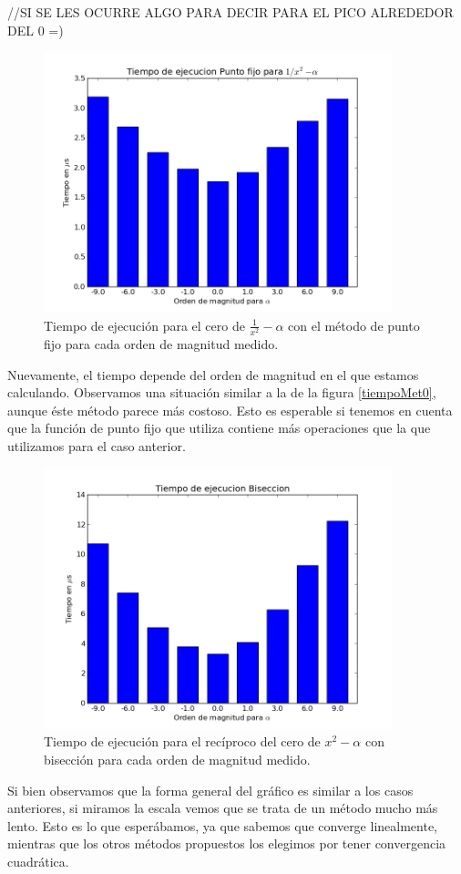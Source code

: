 //SI SE LES OCURRE ALGO PARA DECIR PARA EL PICO ALREDEDOR DEL 0 =)

\begin{figure}[H]
  \centering
    \includegraphics[width=0.9\textwidth]{../data/Tiempo metodo 2.png}
    \caption{Tiempo de ejecución para el cero de $\frac{1}{x^2} - \alpha$ con el método de punto fijo para cada orden de magnitud medido.}
    \label{tiempoMet2}
\end{figure}

Nuevamente, el tiempo depende del orden de magnitud en el que estamos calculando. Observamos una situación similar a la de la figura \ref{tiempoMet0}, aunque éste método parece más costoso. Esto es esperable si tenemos en cuenta que la función de punto fijo que utiliza contiene más operaciones que la que utilizamos para  el caso anterior.

\begin{figure}[H]
  \centering
    \includegraphics[width=0.9\textwidth]{../data/Tiempo metodo 3.png}
    \caption{Tiempo de ejecución para el recíproco del cero de ${x^2} - \alpha$ con bisección para cada orden de magnitud medido.}
    \label{tiempoMet3}
\end{figure}

Si bien observamos que la forma general del gráfico es similar a los casos anteriores, si miramos la escala vemos que se trata de un método mucho más lento. Esto es lo que esperábamos, ya que sabemos que converge linealmente, mientras que los otros métodos propuestos los elegimos por tener convergencia cuadrática.

